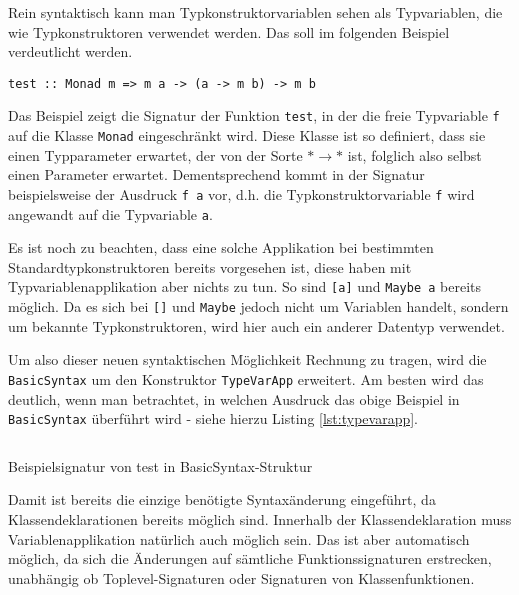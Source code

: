 Rein syntaktisch kann man Typkonstruktorvariablen sehen als Typvariablen, die wie Typkonstruktoren verwendet werden. Das
soll im folgenden Beispiel verdeutlicht werden.


\begin{verbatim}
test :: Monad m => m a -> (a -> m b) -> m b
\end{verbatim}

Das Beispiel zeigt die Signatur der Funktion \texttt{test}, in der die freie Typvariable \texttt{f} auf die Klasse \texttt{Monad}
eingeschränkt wird. Diese Klasse ist so definiert, dass sie einen Typparameter erwartet, der von der Sorte $* \rightarrow *$ ist,
folglich also selbst einen Parameter erwartet. Dementsprechend kommt in der Signatur beispielsweise der Ausdruck \texttt{f a} vor,
d.h. die Typkonstruktorvariable \texttt{f} wird angewandt auf die Typvariable \texttt{a}.

Es ist noch zu beachten, dass eine solche Applikation bei bestimmten Standardtypkonstruktoren bereits vorgesehen ist, diese
haben mit Typvariablenapplikation aber nichts zu tun. So sind \texttt{[a]} und \texttt{Maybe a} bereits möglich. Da es sich
bei \texttt{[]} und \texttt{Maybe} jedoch nicht um Variablen handelt, sondern um bekannte Typkonstruktoren, wird hier auch ein
anderer Datentyp verwendet.

Um also dieser neuen syntaktischen Möglichkeit Rechnung zu tragen, wird die \texttt{BasicSyntax} um den Konstruktor
\texttt{TypeVarApp} erweitert. Am besten wird das deutlich, wenn man betrachtet, in welchen Ausdruck das obige Beispiel
in \texttt{BasicSyntax} überführt wird - siehe hierzu Listing \ref{lst:typevarapp}.

\begin{listing}[ht]
\inputminted[tabsize=2]{haskell}{typevarapp.hs}
\caption{Beispielsignatur von test in BasicSyntax-Struktur}
\label{lst:typevarapp}
\end{listing}

Damit ist bereits die einzige benötigte Syntaxänderung eingeführt, da Klassendeklarationen bereits möglich sind. Innerhalb der
Klassendeklaration muss Variablenapplikation natürlich auch möglich sein. Das ist aber automatisch möglich, da sich die Änderungen
auf sämtliche Funktionssignaturen erstrecken, unabhängig ob Toplevel-Signaturen oder Signaturen von Klassenfunktionen.

